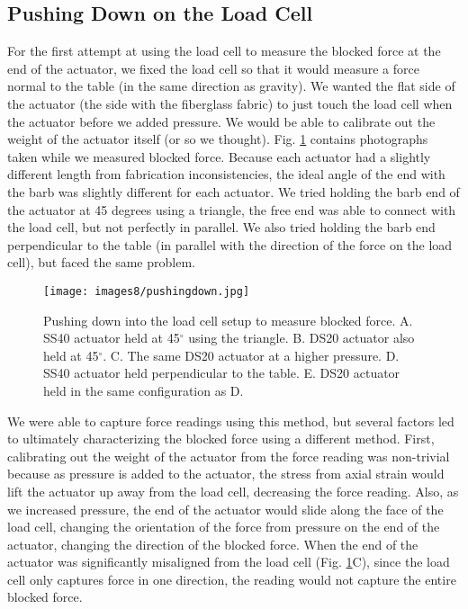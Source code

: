 \subsection{Pushing Down on the Load Cell}

For the first attempt at using the load cell to measure the blocked force at the end of the actuator, we fixed the load cell so that it would measure a force normal to the table (in the same direction as gravity). We wanted the flat side of the actuator (the side with the fiberglass fabric) to just touch the load cell when the actuator before we added pressure. We would be able to calibrate out the weight of the actuator itself (or so we thought). Fig. \ref{fig:pushingdown} contains photographs taken while we measured blocked force. Because each actuator had a slightly different length from fabrication inconsistencies, the ideal angle of the end with the barb was slightly different for each actuator. We tried holding the barb end of the actuator at 45 degrees using a triangle, the free end was able to connect with the load cell, but not perfectly in parallel. We also tried holding the barb end perpendicular to the table (in parallel with the direction of the force on the load cell), but faced the same problem. 

\begin{figure}[ht]
    \centering
     \texttt{[image: images8/pushingdown.jpg]}
    \caption{Pushing down into the load cell setup to measure blocked force. A. SS40 actuator held at 45$^\circ$ using the triangle. B. DS20 actuator also held at 45$^\circ$. C. The same DS20 actuator at a higher pressure. D. SS40 actuator held perpendicular to the table. E. DS20 actuator held in the same configuration as D.}
    \label{fig:pushingdown}
\end{figure}

We were able to capture force readings using this method, but several factors led to ultimately characterizing the blocked force using a different method. First, calibrating out the weight of the actuator from the force reading was non-trivial because as pressure is added to the actuator, the stress from axial strain would lift the actuator up away from the load cell, decreasing the force reading. Also, as we increased pressure, the end of the actuator would slide along the face of the load cell, changing the orientation of the force from pressure on the end of the actuator, changing the direction of the blocked force. When the end of the actuator was significantly misaligned from the load cell (Fig. \ref{fig:pushingdown}C), since the load cell only captures force in one direction, the reading would not capture the entire blocked force. 

